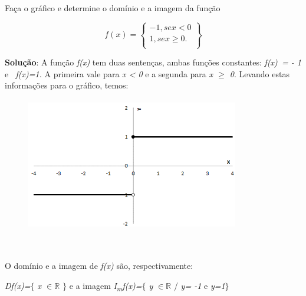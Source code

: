 \begin{texemplo}
Faça o gráfico e determine o domínio e a imagem da função

 \[ f \left( x \right) = \left\{ \begin{matrix}
-1, se x<0\\
1 , se x \geq 0.\\
\end{matrix} \right\}
\] 

\textbf{Solução}: A função \textit{f(x)} tem duas sentenças, ambas funções constantes: \textit{f(x)~= - 1  }e\textit{~ f(x)=1. }A primeira vale para \textit{x < 0} e a segunda para \textit{x $ \geq $  0}. Levando estas informações para o gráfico, temos:

\begin{figure}[H]
	\begin{Center}
		\includegraphics[width=3.66in,height=2.29in]{capitulos/outras_funcoes/media/image22.png}
	\end{Center}
\end{figure}

~~

\quad O domínio e a imagem de \textit{f(x)} são, respectivamente: 

\textit{Df(x)=$ \{ $ x $ \in \mathbb{R} $\textbf{ }$ \} $ } e a imagem  \textit{I\textsubscript{m}f(x)=$ \{ $ y $ \in \mathbb{R} $  }/ \textit{y= -1} e \textit{y=1$ \} $ } \qedsymbol{}
\end{texemplo}

